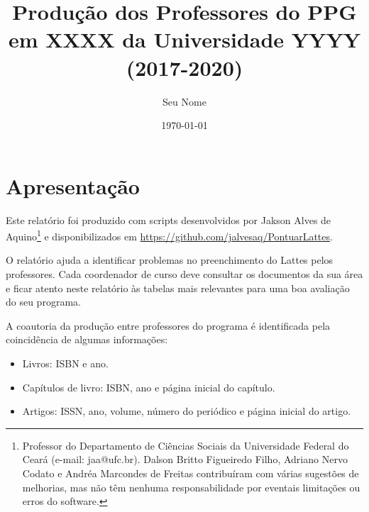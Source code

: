 \documentclass[12pt,brazil]{article}\usepackage[]{graphicx}\usepackage[]{xcolor}
\makeatletter
\newenvironment{kframe}{%
 \def\at@end@of@kframe{}%
 \ifinner\ifhmode%
  \def\at@end@of@kframe{\end{minipage}}%
  \begin{minipage}{\columnwidth}%
 \fi\fi%
 \def\FrameCommand##1{\hskip\@totalleftmargin \hskip-\fboxsep
 \colorbox{shadecolor}{##1}\hskip-\fboxsep
     \hskip-\linewidth \hskip-\@totalleftmargin \hskip\columnwidth}%
 \MakeFramed {\advance\hsize-\width
   \@totalleftmargin\z@ \linewidth\hsize
   \@setminipage}}%
 {\par\unskip\endMakeFramed%
 \at@end@of@kframe}
\newcounter{tabela}
\makeatother
\begin{document}
\begin{kframe}


{\ttfamily\noindent\bfseries\color{errorcolor}{\#\# Error in p\$qualis[i] <- p\$q17[i]: substituto tem comprimento zero}}\end{kframe}

\title{Produção dos Professores do PPG em XXXX da Universidade YYYY (2017-2020)}
\author{Seu Nome}
\date{\today}

\maketitle

\tableofcontents

\newpage

\listoftables

\clearpage


\section{Apresentação}

Este relatório foi produzido com scripts desenvolvidos por Jakson Alves de
Aquino\footnote{Professor do Departamento de Ciências Sociais da Universidade
Federal do Ceará (e-mail: jaa@ufc.br). Dalson Britto Figueiredo Filho, Adriano
Nervo Codato e Andréa Marcondes de Freitas contribuíram com várias sugestões
de melhorias, mas não têm nenhuma responsabilidade por eventais limitações ou
erros do software.} e disponibilizados em
\url{https://github.com/jalvesaq/PontuarLattes}.

O relatório ajuda a identificar problemas no preenchimento do Lattes pelos
professores. Cada coordenador de curso deve consultar os documentos
da sua área e ficar atento neste relatório às tabelas mais
relevantes para uma boa avaliação do seu programa.

A coautoria da produção entre professores do programa é identificada pela
coincidência de algumas informações:

\begin{itemize}

    \item Livros: ISBN e ano.

    \item Capítulos de livro: ISBN, ano e página inicial do capítulo.

    \item Artigos: ISSN, ano, volume, número do periódico e página inicial do
        artigo.

\end{itemize}
\end{document}
